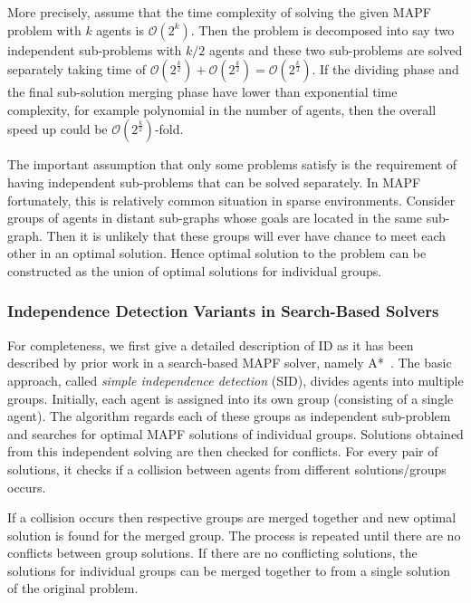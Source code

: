 \documentclass[jair,oneside,11pt]{article}
\begin{document}
More precisely, assume that the time complexity of solving the given MAPF problem with $k$ agents is $\mathcal{O}(2^k)$. Then the problem is decomposed into say two independent sub-problems with $k/2$ agents and these two sub-problems are solved separately taking time of $\mathcal{O}(2^{\frac{k}{2}}) +\mathcal{O}(2^{\frac{k}{2}}) = \mathcal{O}(2^\frac{k}{2})$. If the dividing phase and the final sub-solution merging phase have lower than exponential time complexity, for example polynomial in the number of agents, then the overall speed up could be $\mathcal{O}(2^{\frac{k}{2}})$-fold.

The important assumption that only some problems satisfy is the requirement of having independent sub-problems that can be solved separately. In MAPF fortunately, this is relatively common situation in sparse environments. Consider groups of agents in distant sub-graphs whose goals are located in the same sub-graph. Then it is unlikely that these groups will ever have chance to meet each other in an optimal solution. Hence optimal solution to the problem can be constructed as the union of optimal solutions for individual groups.

\subsubsection{Independence Detection Variants in Search-Based Solvers}

For completeness, we first give a detailed description of ID as it has been described by prior work in a search-based MAPF solver, namely A*~\cite{standley2010finding}. 
The basic approach, called {\em simple independence detection} (SID), divides agents into multiple groups. Initially, each agent is assigned into its own group (consisting of a single agent). The algorithm regards each of these groups as independent sub-problem and searches for optimal MAPF solutions of individual groups. Solutions obtained from this independent solving are then checked for conflicts. For every pair of solutions, it checks if a collision between agents from different solutions/groups occurs.

If a collision occurs then respective groups are merged together and new optimal solution is found for the merged group. The process is repeated until there are no conflicts between group solutions. If there are no conflicting solutions, the solutions for individual groups can be merged together to from a single solution of the original problem.
\end{document}
